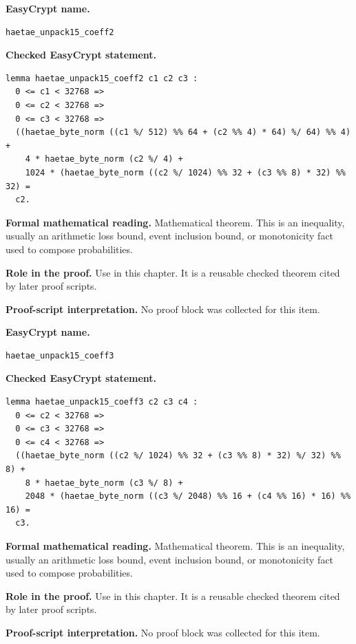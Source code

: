 \begin{formaltheorem}
\noindent\textbf{EasyCrypt name.}
\begin{lstlisting}[language=EasyCrypt,basicstyle=\ttfamily\scriptsize]
haetae_unpack15_coeff2
\end{lstlisting}
\noindent\textbf{Checked EasyCrypt statement.}
\begin{lstlisting}[language=EasyCrypt,basicstyle=\ttfamily\scriptsize]
lemma haetae_unpack15_coeff2 c1 c2 c3 :
  0 <= c1 < 32768 =>
  0 <= c2 < 32768 =>
  0 <= c3 < 32768 =>
  ((haetae_byte_norm ((c1 %/ 512) %% 64 + (c2 %% 4) * 64) %/ 64) %% 4) +
    4 * haetae_byte_norm (c2 %/ 4) +
    1024 * (haetae_byte_norm ((c2 %/ 1024) %% 32 + (c3 %% 8) * 32) %% 32) =
  c2.
\end{lstlisting}
\noindent\textbf{Formal mathematical reading.}
Mathematical theorem. This is an inequality, usually an arithmetic loss bound, event inclusion bound, or monotonicity fact used to compose probabilities.

\noindent\textbf{Role in the proof.}
Use in this chapter. It is a reusable checked theorem cited by later proof scripts.

\noindent\textbf{Proof-script interpretation.}
No proof block was collected for this item.

\end{formaltheorem}

\begin{formaltheorem}
\noindent\textbf{EasyCrypt name.}
\begin{lstlisting}[language=EasyCrypt,basicstyle=\ttfamily\scriptsize]
haetae_unpack15_coeff3
\end{lstlisting}
\noindent\textbf{Checked EasyCrypt statement.}
\begin{lstlisting}[language=EasyCrypt,basicstyle=\ttfamily\scriptsize]
lemma haetae_unpack15_coeff3 c2 c3 c4 :
  0 <= c2 < 32768 =>
  0 <= c3 < 32768 =>
  0 <= c4 < 32768 =>
  ((haetae_byte_norm ((c2 %/ 1024) %% 32 + (c3 %% 8) * 32) %/ 32) %% 8) +
    8 * haetae_byte_norm (c3 %/ 8) +
    2048 * (haetae_byte_norm ((c3 %/ 2048) %% 16 + (c4 %% 16) * 16) %% 16) =
  c3.
\end{lstlisting}
\noindent\textbf{Formal mathematical reading.}
Mathematical theorem. This is an inequality, usually an arithmetic loss bound, event inclusion bound, or monotonicity fact used to compose probabilities.

\noindent\textbf{Role in the proof.}
Use in this chapter. It is a reusable checked theorem cited by later proof scripts.

\noindent\textbf{Proof-script interpretation.}
No proof block was collected for this item.

\end{formaltheorem}

